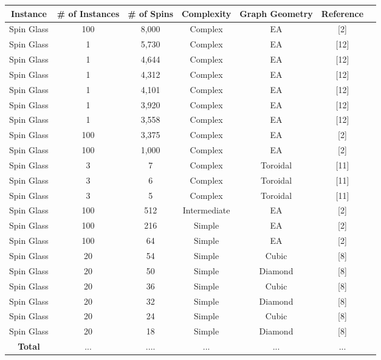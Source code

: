 \documentclass{standalone}
\begin{document}
\begin{tabular}{ |c|c|c|c|c|c|c| } 
    \hline
    \textbf{Instance} & \textbf{\# of Instances} & \textbf{\# of Spins} & \textbf{Complexity} & \textbf{Graph Geometry} & \textbf{Reference}\\ 
    \hline
    Spin Glass & 100 & 8,000 & Complex & EA & [2] \\
    Spin Glass & 1 & 5,730 & Complex & EA & [12] \\
    Spin Glass & 1 & 4,644 & Complex & EA & [12] \\
    Spin Glass & 1 & 4,312 & Complex & EA & [12] \\
    Spin Glass & 1 & 4,101 & Complex & EA & [12] \\
    Spin Glass & 1 & 3,920 & Complex & EA & [12] \\
    Spin Glass & 1 & 3,558 & Complex & EA & [12] \\
    Spin Glass & 100 & 3,375 & Complex & EA & [2] \\
    Spin Glass & 100 & 1,000 & Complex & EA & [2] \\
    Spin Glass & 3 & 7 & Complex & Toroidal & [11] \\
    Spin Glass & 3 & 6 & Complex & Toroidal & [11] \\
    Spin Glass & 3 & 5 & Complex & Toroidal & [11] \\
    Spin Glass & 100 & 512 & Intermediate & EA & [2] \\
    Spin Glass & 100 & 216 & Simple & EA & [2] \\
    Spin Glass & 100 & 64 & Simple & EA & [2] \\
    Spin Glass & 20 & 54 & Simple & Cubic & [8] \\
    Spin Glass & 20 & 50 & Simple & Diamond & [8] \\
    Spin Glass & 20 & 36 & Simple & Cubic & [8] \\
    Spin Glass & 20 & 32 & Simple & Diamond & [8] \\
    Spin Glass & 20 & 24 & Simple & Cubic & [8] \\
    Spin Glass & 20 & 18 & Simple & Diamond & [8] \\
    \hline
    \textbf{Total} & ... & .... & ... & ... & ... \\
    \hline
\end{tabular}
\end{document}

